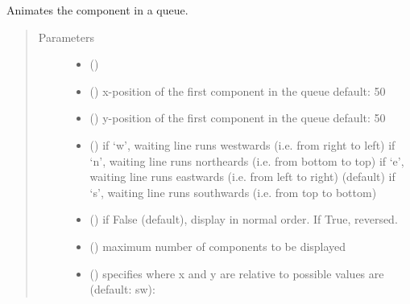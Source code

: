 \documentclass[letterpaper,10pt,english]{sphinxmanual}
\begin{document}
\begin{fulllineitems}
\label{\detokenize{Reference:salabim.AnimateQueue}}
Animates the component in a queue.
\begin{quote}\begin{description}
\item[{Parameters}] \leavevmode\begin{itemize}
\item {} 
 ({\hyperref[\detokenize{Reference:salabim.Queue}]{}}) \textendash{} 

\item {} 
 () \textendash{} x-position of the first component in the queue 
default: 50

\item {} 
 () \textendash{} y-position of the first component in the queue 
default: 50

\item {} 
 () \textendash{} if ‘w’, waiting line runs westwards (i.e. from right to left) 
if ‘n’, waiting line runs northeards (i.e. from bottom to top) 
if ‘e’, waiting line runs eastwards (i.e. from left to right) (default) 
if ‘s’, waiting line runs southwards (i.e. from top to bottom)

\item {} 
 () \textendash{} if False (default), display in normal order. If True, reversed.

\item {} 
 () \textendash{} maximum number of components to be displayed

\item {} 
 () \textendash{} specifies where x and y are relative to 
possible values are (default: sw): 


\end{itemize}
\end{description}
\end{quote}
\end{fulllineitems}
\end{document}
